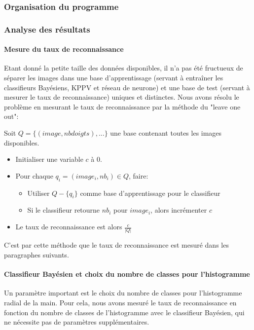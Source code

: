 \subsubsection{Organisation du programme}

\subsubsection{Analyse des résultats}
\paragraph{Mesure du taux de reconnaissance}
Etant donné la petite taille des données disponibles, il n'a pas été fructueux de séparer les images dans une base d'apprentissage (servant à entraîner les classifieurs Bayésiens, KPPV et réseau de neurone) et une base de test (servant à mesurer le taux de reconnaissance) uniques et distinctes. Nous avons résolu le problème en mesurant le taux de reconnaissance par la méthode du "leave one out":

Soit $Q = \{(image, nbdoigts), ...\}$ une base contenant toutes les images disponibles.
\begin{itemize}
\item Initialiser une variable $c$ à 0.
\item Pour chaque $q_i = (image_i, nb_i) \in Q$, faire:
\begin{itemize}
\item Utiliser $Q - \{q_i\}$ comme base d'apprentissage pour le classifieur
\item Si le classifieur retourne $nb_i$ pour $image_i$, alors incrémenter $c$
\end{itemize}
\item Le taux de reconnaissance est alors $\frac{c}{|Q|}$
\end{itemize}

C'est par cette méthode que le taux de reconnaissance est mesuré dans les paragraphes suivants.

\paragraph{Classifieur Bayésien et choix du nombre de classes pour l'histogramme}
Un paramètre important est le choix du nombre de classes pour l'histogramme radial de la main. Pour cela, nous avons mesuré le taux de reconnaissance en fonction du nombre de classes de l'histogramme avec le classifieur Bayésien, qui ne nécessite pas de paramètres supplémentaires.